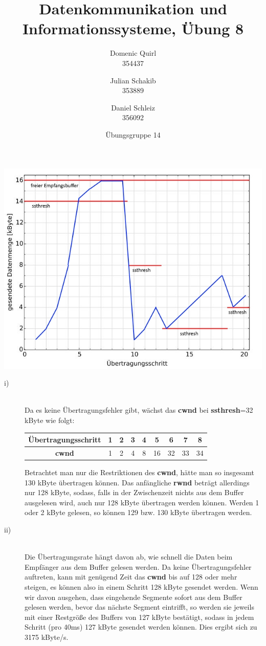 \documentclass{../exercisesheet}
\title{Datenkommunikation und Informationssysteme, Übung 8}
\author{
    Domenic Quirl \\ 354437
    \and
    Julian Schakib \\ 353889
    \and 
    Daniel Schleiz \\ 356092
}
\date{Übungsgruppe 14}
\begin{document}
\maketitle
\pointtable


\begin{exercise}{6}
\begin{subexercise}
\begin{center}
\includegraphics[scale=0.8]{1a_halb.jpg}
\end{center}
\end{subexercise}
\begin{subexercise}
\begin{description}
\item[i)] \ \\
Da es keine Übertragungsfehler gibt, wächst das \textbf{cwnd} bei \textbf{ssthresh}=32 kByte wie folgt:
\begin{center}
\begin{tabular}{c||*{7}{c|}c}
Übertragungsschritt & 1 & 2 & 3 & 4 & 5 & 6 & 7 & 8\\
\hline
\textbf{cwnd} & 1 & 2 & 4 & 8 & 16 & 32 & 33 & 34\\
\end{tabular}
\end{center}
Betrachtet man nur die Restriktionen des \textbf{cwnd}, hätte man so insgesamt 130 kByte übertragen können. Das anfängliche \textbf{rwnd} beträgt allerdings nur 128 kByte, sodass, falls in der Zwischenzeit nichts aus dem Buffer ausgelesen wird, auch nur 128 kByte übertragen werden können. Werden 1 oder 2 kByte gelesen, so können 129 bzw. 130 kByte übertragen werden.
\item[ii)] \ \\
Die Übertragungsrate hängt davon ab, wie schnell die Daten beim Empfänger aus dem Buffer gelesen werden. Da keine Übertragungsfehler auftreten, kann mit genügend Zeit das \textbf{cwnd} bis auf 128 oder mehr steigen, es können also in einem Schritt 128 kByte gesendet werden. Wenn wir davon ausgehen, dass eingehende Segmente sofort aus dem Buffer gelesen werden, bevor das nächste Segment eintrifft, so werden sie jeweils mit einer Restgröße des Buffers von 127 kByte bestätigt, sodass in jedem Schritt (pro 40ms) 127 kByte gesendet werden können. Dies ergibt sich zu 3175 kByte/s.


\end{description}
\end{subexercise}
\end{exercise}
\end{document}
